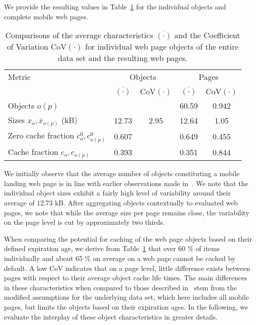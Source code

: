 \documentclass[letterpaper,conference]{IEEEtran}
\begin{document}
We provide the resulting values in Table~\ref{tab:res} for the individual objects and complete mobile web pages.
\begin{table}[]
	\centering
	\caption{Comparisons of the average characteristics $\overline{(\cdot)}$ and the Coefficient of Variation CoV$(\cdot)$ for individual web page objects of the entire data set and the resulting web pages.\label{tab:res}}
	\begin{tabular}{|l||c|c||c|c|}
		\hline
		Metric                    & \multicolumn{2}{|c||}{Objects} & \multicolumn{2}{|c|}{Pages} \\
		& $\overline{(\cdot)}$ &  CoV$(\cdot)$  & $\overline{(\cdot)}$ & CoV$(\cdot)$ \\ \hline
		Objects $o(p)$            &               &        &          60.59          &    0.942     \\ \hline
		
		Sizes $x_o,\overline{x}_{o(p)}$ (kB)        &         12.73        &     2.95     &         12.64         &    1.05     \\ \hline

		Zero cache fraction $c^0_o,c^0_{o(p)}$ &        0.607      &          &        0.649         &  0.455     \\ \hline
		
		Cache fraction $c_o,c_{o(p)}$        &        0.393         &         &        0.351         &  0.844      \\ \hline
	\end{tabular}
\end{table} 
We initially observe that the average number of objects constituting a mobile landing web page is in line with earlier observations made in~\cite{JoSe14Commag}.
We note that the individual object sizes exhibit a fairly high level of variability around their average of 12.73 kB.
After aggregating objects contextually to evaluated web pages, we note that while the average size per page remains close, the variability on the page level is cut by approximately two thirds.

When comparing the potential for caching of the web page objects based on their defined expiration age, we derive from Table~\ref{tab:res} that over 60 \% of items individually and about 65 \% on average on a web page cannot be cached by default. 
A low CoV indicates that on a page level, little difference exists between pages with respect to their average object cache life times. 
The main differences in these characteristics when compared to those described in~\cite{JoSe14Commag} stem from the modified assumptions for the underlying data set, which here includes all mobile pages, but limits the objects based on their expiration ages.
In the following, we evaluate the interplay of these object characteristics in greater details.
\end{document}

